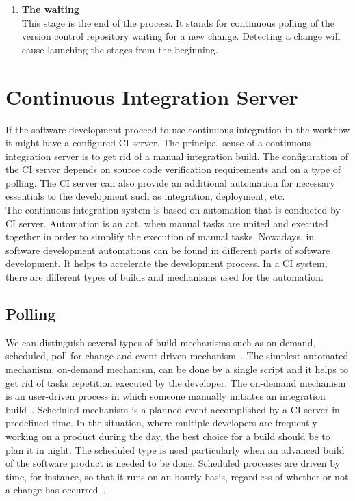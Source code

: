 \begin{enumerate}
    \item \textbf{The waiting}\\[0.1em]
          This stage is the end of the process. It stands for continuous polling of  the version control repository waiting for a new change. Detecting a change will cause launching the stages from the beginning.

\end{enumerate}

\section{Continuous Integration Server}

If the software development proceed to use continuous integration in the workflow it might have a configured CI server. The principal sense of a continuous integration server is to get rid of a manual integration build. The configuration of the CI server depends on source code verification requirements and on a type of polling. The CI server can also provide an additional automation for necessary essentials to the development such as integration, deployment, etc.\\

The continuous integration system is based on automation that is conducted by CI server. Automation is an act, when manual tasks are united and executed together in order to simplify the execution of manual tasks. Nowadays, in software development automations can be found in different parts of software development. It helps to accelerate the development process. In a CI system, there are different types of builds and mechanisms used for the automation.

\subsection{Polling}

We can distinguish several types of build mechanisms such as on-demand, scheduled, poll for change and event-driven mechanism~\cite{CIbook}. The simplest automated mechanism, on-demand mechanism, can be done by a single script and it helps to get rid of tasks repetition executed by the developer. The on-demand mechanism is an user-driven process in which someone manually initiates an integration build~\cite{CIbook}. Scheduled mechanism is a planned event accomplished by a CI server in predefined time. In the situation, where multiple developers are frequently working on a product during the day, the best choice for a build should be to plan it in night. The scheduled type is used particularly when an advanced build of the software product is needed to be done. Scheduled processes are driven by time, for instance, so that it runs on an hourly basis, regardless of whether or not a change has occurred~\cite{CIbook}.\\


